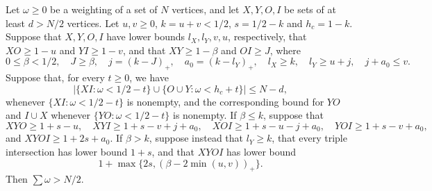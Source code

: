 \begin{lemma}
\label{simpleunion:singleton-credit}
\label{top372:multilayer}
Let $\omega\ge0$ be a weighting of a set of $N$ vertices, and let $X,Y,O,I$ be sets of at least $d>N/2$ vertices. Let $u,v\ge0$, $k=u+v<1/2$,
$s=1/2-k$ and $h_c=1-k$. Suppose that $X,Y,O,I$ have lower bounds
$l_X,l_Y,v,u$, respectively, that $XO\ge1-u$ and $YI\ge1-v$,
and that $XY\ge1-\beta$ and $OI\ge J$, where
\[
 0\le\beta<1/2,\quad J\ge\beta,\quad
 j=(k-J)_+,\quad a_0=(k-l_Y)_+,\quad
 l_X\ge k,\quad l_Y\ge u+j,\quad j+a_0\le v.
\]
Suppose that, for every $t\ge0$, we have
\[
 \left|\{XI:\omega<1/2-t\}\cup\{O\cup Y:\omega<h_c+t\}\right|
 \le N-d,
\]
whenever $\{XI:\omega<1/2-t\}$ is nonempty, and the corresponding bound for $YO$ and $I\cup X$ whenever $\{YO:\omega<1/2-t\}$ is nonempty. If $\beta\le k$, suppose that
\[
 XYO\ge1+s-u,\quad XYI\ge1+s-v+j+a_0,\quad XOI\ge1+s-u-j+a_0,\quad YOI\ge1+s-v+a_0,
\]
and $XYOI\ge1+2s+a_0$.
If $\beta>k$, suppose instead that $l_Y\ge k$, that every triple intersection has lower bound
$1+s$, and that $XYOI$ has lower bound
\[
               1+\max\{2s,(\beta-2\min(u,v))_+\}.
\]
Then $\sum\omega>N/2$.
\end{lemma}
